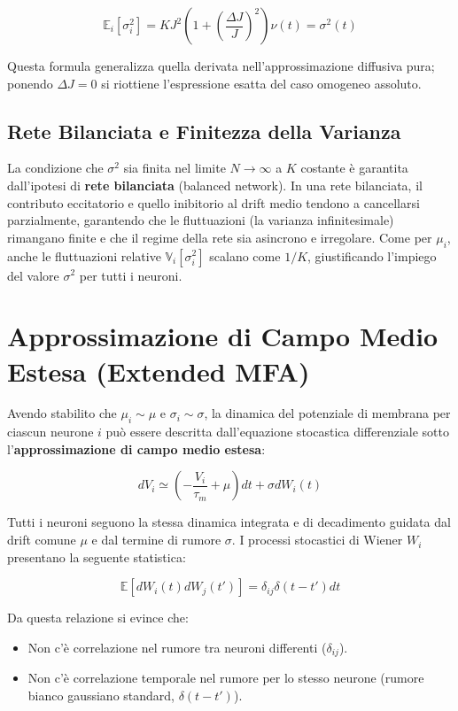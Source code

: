 \begin{equation}
\mathbb{E}_i[\sigma_i^2] = K J^2 \left( 1 + \left(\frac{\Delta J}{J}\right)^2 \right) \nu(t) = \sigma^2(t)
\end{equation}

Questa formula generalizza quella derivata nell'approssimazione diffusiva pura; ponendo $\Delta J = 0$ si riottiene l'espressione esatta del caso omogeneo assoluto.

\subsection{Rete Bilanciata e Finitezza della Varianza}
La condizione che $\sigma^2$ sia finita nel limite $N \to \infty$ a $K$ costante è garantita dall'ipotesi di \textbf{rete bilanciata} (balanced network). In una rete bilanciata, il contributo eccitatorio e quello inibitorio al drift medio tendono a cancellarsi parzialmente, garantendo che le fluttuazioni (la varianza infinitesimale) rimangano finite e che il regime della rete sia asincrono e irregolare. Come per $\mu_i$, anche le fluttuazioni relative $\mathbb{V}_i[\sigma_i^2]$ scalano come $1/K$, giustificando l'impiego del valore $\sigma^2$ per tutti i neuroni.

\section{Approssimazione di Campo Medio Estesa (Extended MFA)}

Avendo stabilito che $\mu_i \sim \mu$ e $\sigma_i \sim \sigma$, la dinamica del potenziale di membrana per ciascun neurone $i$ può essere descritta dall'equazione stocastica differenziale sotto l'\textbf{approssimazione di campo medio estesa}:

\begin{equation}
dV_i \simeq \left( -\frac{V_i}{\tau_m} + \mu \right)dt + \sigma dW_i(t)
\end{equation}


Tutti i neuroni seguono la stessa dinamica integrata e di decadimento guidata dal drift comune $\mu$ e dal termine di rumore $\sigma$. I processi stocastici di Wiener $W_i$ presentano la seguente statistica:

\begin{equation}
\mathbb{E}[dW_i(t) dW_j(t')] = \delta_{ij} \delta(t - t') dt
\end{equation}

Da questa relazione si evince che:
\begin{itemize}
    \item Non c'è correlazione nel rumore tra neuroni differenti ($\delta_{ij}$).
    \item Non c'è correlazione temporale nel rumore per lo stesso neurone (rumore bianco gaussiano standard, $\delta(t-t')$).
\end{itemize}


